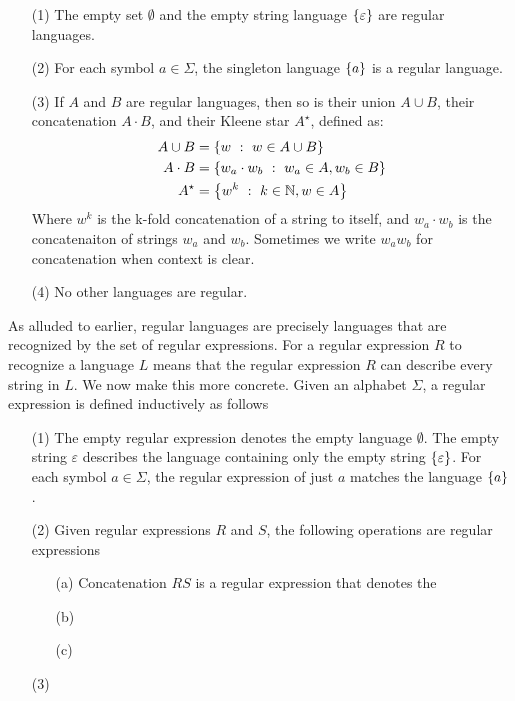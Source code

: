 \begin{enumerate}
  \item[(1)]
    The empty set \(\emptyset\) and the empty string language
    \(\left\{\varepsilon\right\}\) are regular languages.

  \item[(2)]
    For each symbol \(a \in \Sigma\),
    the singleton language \(\left\{a\right\}\) is a regular language.

  \item[(3)]
    If \(A\) and \(B\) are regular languages,
    then so is their union \(A \cup B\),
    their concatenation \(A \cdot B\), and their Kleene star \(A^\star\),
    defined as:
    \begin{align*}
      A \cup B
        &= \left\{w \  : \  w \in A \cup B\right\} \\
      A \cdot B
        &= \left\{w_a \cdot w_b \  : \  w_a \in A, w_b \in B\right\} \\
      A^\star
        &= \left\{w^k \  : \  k \in \mathbb{N}, w \in A\right\}
    \end{align*}
    Where \(w^k\) is the k-fold concatenation of a string to itself,
    and \(w_a \cdot w_b\) is the concatenaiton of strings
    \(w_a\) and \(w_b\).
    Sometimes we write \(w_a w_b\) for concatenation when context is clear.

  \item[(4)]
    No other languages are regular.
\end{enumerate}

As alluded to earlier,
regular languages are precisely languages
that are recognized by the set of regular expressions.
For a regular expression \(R\) to recognize a language \(L\) means that
the regular expression \(R\) can describe every string in \(L\).
We now make this more concrete.
Given an alphabet \(\Sigma\),
a regular expression is defined inductively as follows


\begin{enumerate}
  \item[(1)]
    The empty regular expression denotes the empty language \(\emptyset\).
    The empty string \(\varepsilon\) describes the
    language containing only the empty string \(\left\{\varepsilon\right\}\).
    For each symbol \(a \in \Sigma\), 
    the regular expression of just \(a\) matches the language
    \(\left\{a\right\}\).

  \item[(2)]
    Given regular expressions \(R\) and \(S\),
    the following operations are regular expressions
    \begin{enumerate}
      \item[(a)]
        Concatenation \(RS\) is a regular expression that denotes
        the 

      \item[(b)]
      
      \item[(c)]
    \end{enumerate}

  \item[(3)]
\end{enumerate}

